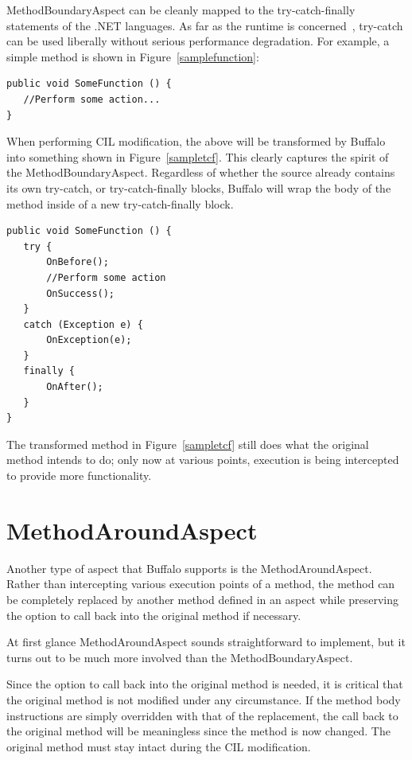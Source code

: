 MethodBoundaryAspect can be cleanly mapped to the try-catch-finally statements of the .NET languages. As far as the runtime is concerned~\cite{ecma334, ecma335}, try-catch can be used liberally without serious performance degradation. For example, a simple method is shown in Figure~\ref{samplefunction}:

\begin{lstlisting}[caption={Sample Function}, label=samplefunction]
public void SomeFunction () {
   //Perform some action...
}
\end{lstlisting}

When performing CIL modification, the above will be transformed by Buffalo into something shown in Figure~\ref{sampletcf}. This clearly captures the spirit of the MethodBoundaryAspect. Regardless of whether the source already contains its own try-catch, or try-catch-finally blocks, Buffalo will wrap the body of the method inside of a new try-catch-finally block.

\begin{lstlisting}[caption={Sample Try-catch-finally}, label=sampletcf]
public void SomeFunction () {
   try {
       OnBefore();
       //Perform some action
       OnSuccess();
   }
   catch (Exception e) {
       OnException(e);
   }
   finally {
       OnAfter();
   }
}
\end{lstlisting}

The transformed method in Figure~\ref{sampletcf} still does what the original method intends to do; only now at various points, execution is being intercepted to provide more functionality. 

\section{MethodAroundAspect}
Another type of aspect that Buffalo supports is the MethodAroundAspect. Rather than intercepting various execution points of a method, the method can be completely replaced by another method defined in an aspect while preserving the option to call back into the original method if necessary.

At first glance MethodAroundAspect sounds straightforward to implement, but it turns out to be much more involved than the MethodBoundaryAspect.

Since the option to call back into the original method is needed, it is critical that the original method is not modified under any circumstance. If the method body instructions are simply overridden with that of the replacement, the call back to the original method will be meaningless since the method is now changed. The original method must stay intact during the CIL modification.


